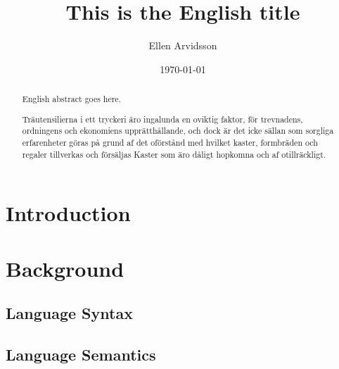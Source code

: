 \documentclass{kththesis}
\title{This is the English title}
\author{Ellen Arvidsson}
\date{\today}
\begin{document}
\frontmatter

\titlepage

\begin{abstract}
  English abstract goes here.

\end{abstract}


\begin{otherlanguage}{swedish}
  \begin{abstract}
    Träutensilierna i ett tryckeri äro ingalunda en oviktig faktor,
    för trevnadens, ordningens och ekonomiens upprätthållande, och
    dock är det icke sällan som sorgliga erfarenheter göras på grund
    af det oförstånd med hvilket kaster, formbräden och regaler
    tillverkas och försäljas Kaster som äro dåligt hopkomna och af
    otillräckligt.
  \end{abstract}
\end{otherlanguage}


\tableofcontents


\mainmatter

\chapter{Introduction}
\label{cha:introduction}


\chapter{Background}
\label{cha:background}

\section{Language Syntax}
\label{sec:language_syntax}


\section{Language Semantics}
\label{sec:language_semantics}
\end{document}
